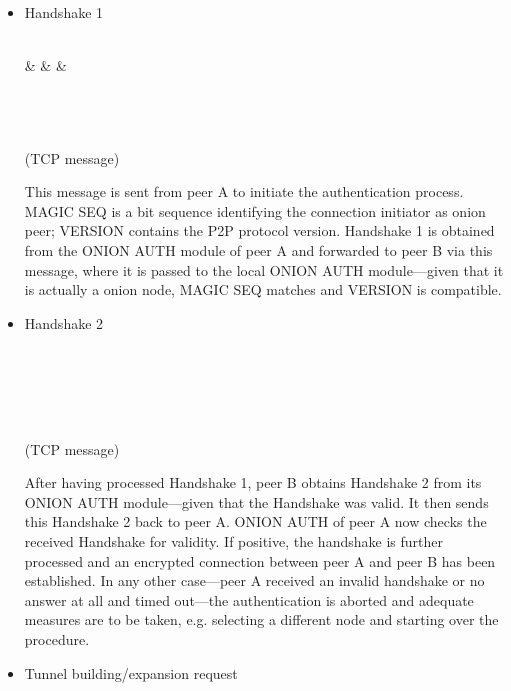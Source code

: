 \documentclass{article}
\begin{document}
\begin{itemize}
	\item Handshake 1 \\

		\begin{bytefield}[bitwidth=1.0em]{32}
			 \\
			& 
			& 
			&  \\
			 \\
			\skippedwords \\	
		\end{bytefield} \\
		(TCP message)
		
		This message is sent from peer A to initiate the authentication process. MAGIC SEQ is a bit sequence identifying the connection initiator as onion peer; VERSION contains the P2P protocol version. Handshake 1 is obtained from the ONION AUTH module of peer A and forwarded to peer B via this message, where it is passed to the local ONION AUTH module---given that it is actually a onion node, MAGIC SEQ matches and VERSION is compatible.
		
	\item Handshake 2 \\

		\begin{bytefield}[bitwidth=1.0em]{32}
			\bitheader{0,7,8,15,16,23,24,31} \\
			\bitbox[lrt]{32}{Handshake 2} \\
			\skippedwords \\				
			\wordbox[blr]{1}{}
		\end{bytefield} \\
		(TCP message)
		
		After having processed Handshake 1, peer B obtains Handshake 2 from its ONION AUTH module---given that the Handshake was valid. It then sends this Handshake 2 back to peer A. ONION AUTH of peer A now checks the received Handshake for validity. If positive, the handshake is further processed and an encrypted connection between peer A and peer B has been established. In any other case---peer A received an invalid handshake or no answer at all and timed out---the authentication is aborted and adequate measures are to be taken, e.g. selecting a different node and starting over the procedure.
	
	\item Tunnel building/expansion request \\
	

\end{itemize}
\end{document}

